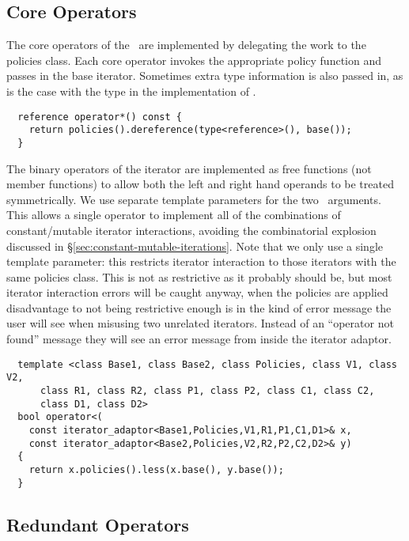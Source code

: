 \documentclass{netobjectdays}
\newcommand{\iteratoradaptor}{\code{iterator\_\-adaptor}}
\begin{document}
\subsection{Core Operators}

The core operators of the \iteratoradaptor\ are implemented by
delegating the work to the policies class. Each core operator invokes
the appropriate policy function and passes in the base
iterator. Sometimes extra type information is also passed in, as is
the case with the  type in the implementation of
.

{\footnotesize
\begin{verbatim}
  reference operator*() const {
    return policies().dereference(type<reference>(), base());
  }
\end{verbatim}
}

The binary operators of the iterator are implemented as free functions
(not member functions) to allow both the left and right hand operands
to be treated symmetrically.  We use separate template parameters for
the two \iteratoradaptor\ arguments. This allows a single
operator to implement all of the combinations of constant/mutable
iterator interactions, avoiding the combinatorial explosion discussed
in \S\ref{sec:constant-mutable-iterations}. Note that we only use a
single  template parameter: this restricts iterator
interaction to those iterators with the same policies class.  This is
not as restrictive as it probably should be, but most iterator
interaction errors will be caught anyway, when the policies are applied
disadvantage to not being restrictive enough is in the kind of error
message the user will see when misusing two unrelated
iterators. Instead of an ``operator not found'' message they will see
an error message from inside the iterator adaptor.

{\footnotesize
\begin{verbatim}
  template <class Base1, class Base2, class Policies, class V1, class V2,
      class R1, class R2, class P1, class P2, class C1, class C2, 
      class D1, class D2>
  bool operator<(
    const iterator_adaptor<Base1,Policies,V1,R1,P1,C1,D1>& x,
    const iterator_adaptor<Base2,Policies,V2,R2,P2,C2,D2>& y)
  {
    return x.policies().less(x.base(), y.base());
  }
\end{verbatim}
}


\subsection{Redundant Operators}
\end{document}
